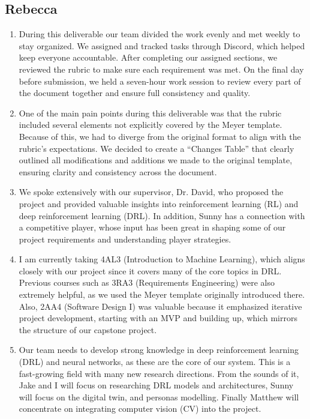 \documentclass{article}
\begin{document}
\subsection*{Rebecca}\label{subsec:rebecca}
\begin{enumerate}
    \item During this deliverable our team divided the work evenly and met weekly to stay 
    organized. We assigned and tracked tasks through Discord, which 
    helped keep everyone accountable. After completing our assigned
     sections, we reviewed the rubric to make sure each requirement
      was met. On the final day before submission, we held a seven-hour
      work session to review every part of the document together and
       ensure full consistency and quality.

    \item One of the main pain points during this deliverable was that the rubric included
    several elements not explicitly covered by the Meyer template.
     Because of this, we had to diverge from the original format to 
     align with the rubric’s expectations. We decided to create
      a “Changes Table” that clearly outlined all modifications and
       additions we made to the original template, ensuring clarity
        and consistency across the document.

    \item We spoke extensively with our supervisor, Dr. David,
     who proposed the project and provided valuable insights into 
     reinforcement learning (RL) and deep reinforcement learning (DRL).
      In addition, Sunny has a connection with a competitive 
      \emph{\Catan{}} player, whose input has been great in
     shaping some of our project requirements and understanding 
       player strategies.

    \item I am currently taking 4AL3 (Introduction to Machine Learning),
     which aligns closely with our project since it covers many of the
      core topics in DRL. Previous courses such as 3RA3 (Requirements Engineering)
       were also extremely helpful, as we used the Meyer template
        originally introduced there. Also, 2AA4 (Software Design I)
         was valuable because it emphasized iterative project development, starting
          with an MVP and building up, which mirrors the structure of our capstone project.

    \item Our team needs to develop strong knowledge in deep reinforcement learning (DRL)
     and neural networks, as these are the core of our system. This is a fast-growing field
      with many new research directions. From the sounds of it, Jake and I will focus on researching DRL models 
      and architectures, Sunny will focus on the digital twin,
      and personas modelling. Finally Matthew will concentrate on integrating computer vision (CV) into the project.


\end{enumerate}
\end{document}

